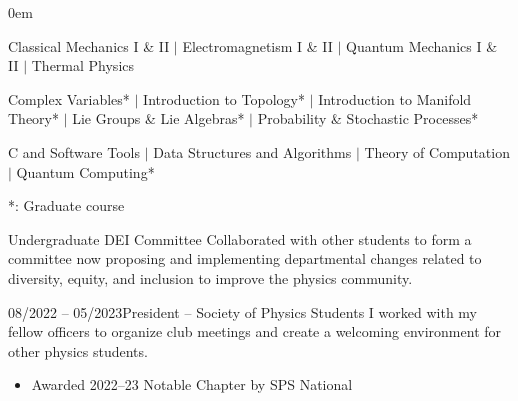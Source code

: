 \documentclass{cv}
\begin{document}
\vspace{-0.12in}

\begin{description}[leftmargin=!,labelwidth=10pt]
    \itemsep0em
    \item [Physics:] Classical Mechanics I \& II $|$ Electromagnetism I \& II
        $|$ Quantum Mechanics I \& II $|$ Thermal Physics
    \item [Math:] Complex Variables* $|$ Introduction to Topology* $|$
        Introduction to Manifold Theory* $|$ Lie Groups \& Lie Algebras* $|$
        Probability \& Stochastic Processes*
    \item [Computer Science:] C and Software Tools $|$ Data Structures and
        Algorithms $|$ Theory of Computation $|$ Quantum Computing*
\end{description}

\vspace{-0.6em}
*: Graduate course
\vspace{0.6em}


\begin{extracurricular}{}{Undergraduate DEI Committee}
    Collaborated with other students to form a committee now proposing and
    implementing departmental changes related to diversity, equity, and
    inclusion to improve the physics community.
\end{extracurricular}

\begin{extracurricular}{08/2022 -- 05/2023}{President -- Society of Physics Students}
    I worked with my fellow officers to organize club meetings and create a
    welcoming environment for other physics students.
    \vspace{-0.03in}
    \begin{itemize}[leftmargin=15pt]
        \item Awarded 2022--23 Notable Chapter by SPS National
    \end{itemize}
\end{extracurricular}
\end{document}
